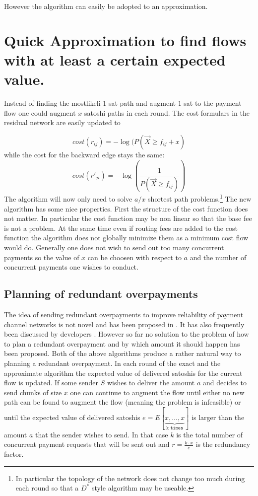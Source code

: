 \documentclass[10pt,twocolumn]{article}
\begin{document}
However the algorithm can easily be adopted to an approximation.

\section{Quick Approximation to find flows with at least a certain expected value.}
Instead of finding the mostlikeli $1$ sat path and augment $1$ sat to the payment flow one could augment $x$ satoshi paths in each round.
The cost formulars in the residual network are easily updated to

\[
cost(r_{ij})=-\log(P(\vec{X} \geq f_{ij} + x)
\]
while the cost for the backward edge stays the same:
\[
cost(r'_{ji}) = -\log\left(\frac{1}{P(\vec{X} \geq f_{ij})}\right)
\]
The algorithm will now only need to solve $a/x$ shortest path problems.\footnote{In particular the topology of the network does not change too much during each round so that a $D^*$ style algorithm \cite{stentz1997optimal} may be useable.}
The new algorithm has some nice properties.
First the structure of the cost function does not matter.
In particular the cost function may be non linear so that the base fee is not a problem.
At the same time even if routing fees are added to the cost function the algorithm does not globally minimize them as a minimum cost flow would do.
Generally one does not wish to send out too many concurrent payments so the value of $x$ can be choosen with respect to $a$ and the number of concurrent payments one wishes to conduct.

\subsection{Planning of redundant overpayments}
The idea of sending redundant overpayments to improve reliability of payment channel networks is not novel and has been proposed in \cite{bagaria2020boomerang,rahimpour2021spear}.
It has also frequently been discussed by developers \cite{pickhardt2022,riard2023,corallo2023}.
However so far no solution to the problem of how to plan a redundant overpayment and by which amount it should happen has been proposed.
Both of the above algorithms produce a rather natural way to planning a redundant overpayment.
In each round of the exact and the approximate algorithm the expected value of delivered satoshis for the current flow is updated.
If some sender $S$ wishes to deliver the amount $a$ and decides to send chunks of size $x$ one can continue to augment the flow until either no new path can be found to augment the flow (meaning the problem is infeasible) or until the expected value of delivered satoshis $e = E[\underbrace{x,\dots,x}_{\texttt{k times}}]$ is larger than the amount $a$ that the sender wishes to send. In that case $k$ is the total number of concurrent payment requests that will be sent out and $r = \frac{k\cdot x}{e}$ is the redundancy factor.
\end{document}
